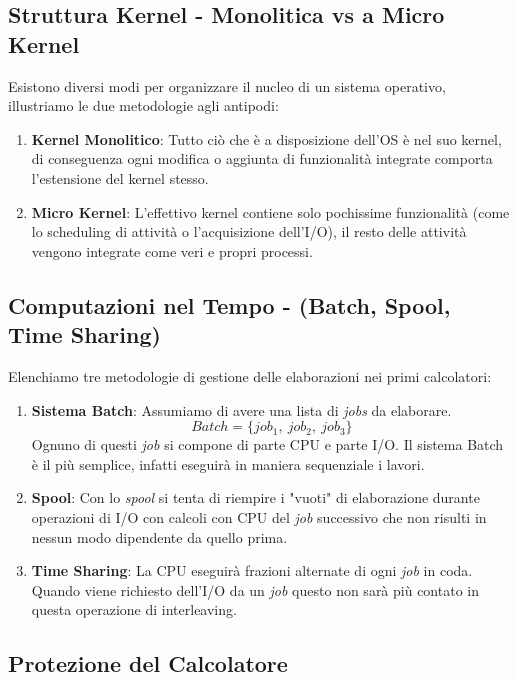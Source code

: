 \documentclass{article}
\begin{document}
\subsection{Struttura Kernel - Monolitica vs a Micro Kernel}

Esistono diversi modi per organizzare il nucleo di un sistema operativo, illustriamo le due metodologie agli antipodi:

\begin{enumerate}
    \item \textbf{Kernel Monolitico}: Tutto ciò che è a disposizione dell'OS è nel suo kernel, di conseguenza ogni modifica o aggiunta di funzionalità integrate comporta l'estensione del kernel stesso.
    \item \textbf{Micro Kernel}: L'effettivo kernel contiene solo pochissime funzionalità (come lo scheduling di attività o l'acquisizione dell'I/O), il resto delle attività vengono integrate come veri e propri processi.
\end{enumerate}

\subsection{Computazioni nel Tempo - (Batch, Spool, Time Sharing)}

Elenchiamo tre metodologie di gestione delle elaborazioni nei primi calcolatori:

\begin{enumerate}
    \item \textbf{Sistema Batch}: Assumiamo di avere una lista di \textit{jobs} da elaborare. \[ Batch = \{job_1,\:job_2, \:job_3\} \]
    Ognuno di questi \textit{job} si compone di parte CPU e parte I/O. Il sistema Batch è il più semplice, infatti eseguirà in maniera sequenziale i lavori.
    \item \textbf{Spool}: Con lo \textit{spool} si tenta di riempire i "vuoti" di elaborazione durante operazioni di I/O con calcoli con CPU del \textit{job} successivo che non risulti in nessun modo dipendente da quello prima.
    
    \newpage
    
    \item \textbf{Time Sharing}: La CPU eseguirà frazioni alternate di ogni \textit{job} in coda. Quando viene richiesto dell'I/O da un \textit{job} questo non sarà più contato in questa operazione di interleaving.
\end{enumerate}

\subsection{Protezione del Calcolatore}
\end{document}
